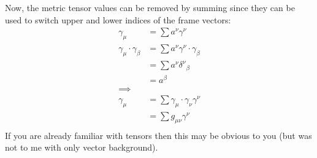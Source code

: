 %
Now, the metric tensor values can be removed by summing since they can be used to switch upper and lower indices of the frame vectors:
%
\begin{equation}\label{eqn:massVaryLagrangian:120}
\begin{aligned}
\gamma_{\mu} &= \sum a^{\nu} \gamma^{\nu} \\
\gamma_{\mu} \cdot \gamma_{\beta}
&= \sum a^{\nu} \gamma^{\nu} \cdot \gamma_{\beta} \\
&= \sum a^{\nu} {\delta^{\nu}}_{\beta} \\
&= a^{\beta} \\
\implies \\
\gamma_{\mu}
&= \sum \gamma_{\mu} \cdot \gamma_{\nu} \gamma^{\nu} \\
&= \sum g_{\mu\nu} \gamma^{\nu} \\
\end{aligned}
\end{equation}
%
If you are already familiar with tensors then this may be obvious to you (but was not to me with only vector background).

